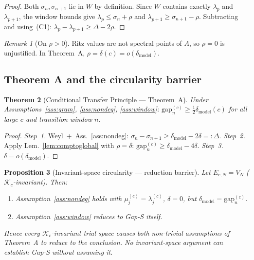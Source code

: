 \documentclass[12pt,a4paper]{amsart}
\newtheorem{theorem}{Theorem}[section]
\newtheorem{proposition}[theorem]{Proposition}
\theoremstyle{definition}
\theoremstyle{remark}
\newtheorem{remark}[theorem]{Remark}
\newcommand{\Kc}{\mathcal{K}_c}
\newcommand{\lam}[2]{\lambda_{#2}^{(#1)}}
\newcommand{\gap}[2]{\mathrm{gap}_{#2}^{(#1)}}
\begin{document}
\begin{proof}
Both $\sigma_n, \sigma_{n+1}$ lie in $W$ by definition.
Since $W$ contains exactly $\lambda_p$ and $\lambda_{p+1}$,
the window bounds give
$\lambda_p \leq \sigma_n + \rho$ and $\lambda_{p+1} \geq \sigma_{n+1}-\rho$.
Subtracting and using~(C1): $\lambda_p - \lambda_{p+1} \geq \Delta - 2\rho$.
\end{proof}

\begin{remark}[On $\rho > 0$]
\label{rem:rho}
Ritz values are not spectral points of $A$, so $\rho = 0$ is unjustified.
In Theorem~A, $\rho = \delta(c) = o(\delta_{\mathrm{model}})$.
\end{remark}

\subsection{Theorem A and the circularity barrier}

\begin{theorem}[Conditional Transfer Principle --- Theorem~A]
\label{thm:A}
Under Assumptions~\ref{ass:gram}, \ref{ass:nondeg}, \ref{ass:window}:
$\gap{c}{n} \geq \tfrac{1}{2}\delta_{\mathrm{model}}(c)$
for all large $c$ and transition-window $n$.
\end{theorem}

\begin{proof}
\textit{Step~1.} Weyl~$+$~Ass.~\ref{ass:nondeg}:
$\sigma_n-\sigma_{n+1} \geq \delta_{\mathrm{model}}-2\delta =: \Delta$.
\textit{Step~2.} Apply Lem.~\ref{lem:comptoglobal} with $\rho=\delta$:
$\gap{c}{n} \geq \delta_{\mathrm{model}}-4\delta$.
\textit{Step~3.} $\delta = o(\delta_{\mathrm{model}})$.
\end{proof}

\begin{proposition}[Invariant-space circularity --- reduction barrier]
\label{prop:circular}
Let $E_{c,N} = V_N$ ($\Kc$-invariant). Then:
\begin{enumerate}[nosep]
  \item Assumption~\ref{ass:nondeg} holds with
    $\mu_j^{(c)} = \lam{c}{j}$, $\delta=0$,
    but $\delta_{\mathrm{model}} = \gap{c}{n}$.
  \item Assumption~\ref{ass:window} reduces to Gap-S itself.
\end{enumerate}
Hence every $\Kc$-invariant trial space causes both non-trivial
assumptions of Theorem~A to reduce to the conclusion.
No invariant-space argument can establish Gap-S without assuming it.
\end{proposition}
\end{document}
